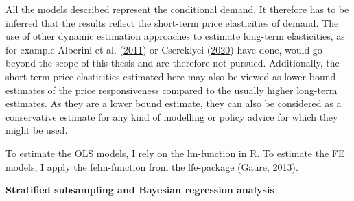 \documentclass[12pt,twoside]{reedthesis}
\begin{document}
All the models described represent the conditional demand. It therefore has to be inferred that the results reflect the short-term price elasticities of demand. The use of other dynamic estimation approaches to estimate long-term elasticities, as for example Alberini et al. (\protect\hyperlink{ref-alberini_etal11}{2011}) or Csereklyei (\protect\hyperlink{ref-csereklyei20}{2020}) have done, would go beyond the scope of this thesis and are therefore not pursued. Additionally, the short-term price elasticities estimated here may also be viewed as lower bound estimates of the price responsiveness compared to the usually higher long-term estimates. As they are a lower bound estimate, they can also be considered as a conservative estimate for any kind of modelling or policy advice for which they might be used.

To estimate the OLS models, I rely on the lm-function in R. To estimate the FE models, I apply the felm-function from the lfe-package (\protect\hyperlink{ref-gaure2013lfe}{Gaure, 2013}).

\textbf{Stratified subsampling and Bayesian regression analysis}
\end{document}
